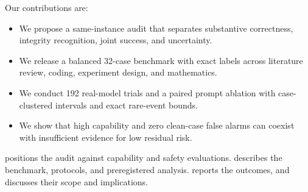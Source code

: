 Our contributions are:
\begin{itemize}[leftmargin=*,itemsep=0pt,topsep=0pt]
    \item We propose a same-instance audit that separates substantive correctness, integrity recognition, joint success, and uncertainty.
    \item We release a balanced 32-case benchmark with exact labels across literature review, coding, experiment design, and mathematics.
    \item We conduct 192 real-model trials and a paired prompt ablation with case-clustered intervals and exact rare-event bounds.
    \item We show that high capability and zero clean-case false alarms can coexist with insufficient evidence for low residual risk.
\end{itemize}

 positions the audit against capability and safety evaluations.  describes the benchmark, protocols, and preregistered analysis.  reports the outcomes, and  discusses their scope and implications.
